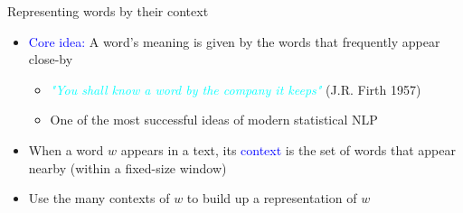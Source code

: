 \documentclass[usenames,dvipsnames,english]{beamer}
\begin{document}
\begin{frame}{Representing words by their context}
\begin{itemize}
\setlength{\itemsep}{1.2em}

    \item \textcolor{blue}{Core idea:} A word's meaning is given by the words that frequently appear close-by
    \begin{itemize}
    \vspace{3pt}
    \setlength{\itemsep}{0.6em}
        \item \textcolor{cyan}{\textit{"You shall know a word by the company it keeps"}} (J.R. Firth 1957)
        \item One of the most successful ideas of modern statistical NLP
    \end{itemize}
    
    \item When a word $w$ appears in a text, its \textcolor{blue}{context} is the set of words that appear nearby (within a fixed-size window)
    \item Use the many contexts of $w$ to build up a representation of $w$

        
\begin{adjustwidth*}{1em}{-1em}
 \setlength\tabcolsep{0.5pt}
\renewcommand{\arraystretch}{0.8}
\end{adjustwidth*}


\end{itemize}
\end{frame}
\end{document}

